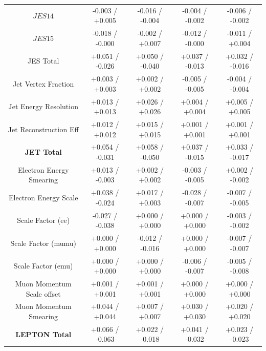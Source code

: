 \begin{table}[htbp]
\begin{center}
\begin{tabular}{|c|c|c|c|c|}
   $JES {14}$                          &  -0.003   / +0.005   & -0.016   / -0.004   & -0.004   / -0.002   & -0.006   / -0.002   \\
   $JES {15}$                          &  -0.018   / -0.000   & -0.002   / +0.007   & -0.012   / -0.000   & -0.011   / +0.004   \\
   \hline
   JES Total                             &  +0.051   / -0.026   & +0.050   / -0.040   & +0.037   / -0.013   & +0.032   / -0.016   \\
   Jet Vertex Fraction                   &  +0.003   / +0.003   & +0.002   / +0.002   & -0.005   / -0.005   & -0.004   / -0.004   \\
   Jet Energy Resolution                 &  +0.013   / +0.013   & +0.026   / +0.026   & +0.004   / +0.004   & +0.005   / +0.005   \\
   Jet Reconstruction Eff                &  +0.012   / +0.012   & +0.015   / +0.015   & +0.001   / +0.001   & +0.001   / +0.001   \\
   \hline
   \textbf{JET Total}                    &  +0.054   / -0.031   & +0.058   / -0.050   & +0.037   / -0.015   & +0.033   / -0.017   \\
   \hline
   Electron Energy Smearing              &  +0.013   / -0.003   & +0.002   / +0.002   & -0.003   / -0.005   & +0.002   / -0.002   \\
   Electron Energy Scale                 &  +0.038   / -0.024   & +0.017   / +0.003   & -0.028   / -0.007   & -0.007   / -0.005   \\
   Scale Factor (ee)                     &  -0.027   / -0.038   & +0.000   / +0.000   & +0.000   / +0.000   & -0.003   / -0.002   \\
   Scale Factor (mumu)                   &  +0.000   / +0.000   & -0.012   / -0.016   & +0.000   / +0.000   & -0.007   / -0.007   \\
   Scale Factor (emu)                    &  +0.000   / +0.000   & +0.000   / +0.000   & -0.006   / -0.007   & -0.005   / -0.008   \\
   Muon Momentum Scale offset            &  +0.001   / +0.001   & +0.001   / +0.001   & +0.000   / +0.000   & +0.000   / +0.000   \\
   Muon Momentum Smearing                &  +0.044   / +0.044   & +0.007   / +0.007   & +0.030   / +0.030   & +0.020   / +0.020   \\
   \hline
   \textbf{LEPTON Total}                 &  +0.066   / -0.063   & +0.022   / -0.018   & +0.041   / -0.032   & +0.023   / -0.023   \\

\end{tabular}
\end{center}
\end{table}
